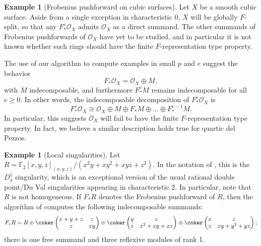 \documentclass[12pt]{amsart}
\def\OO{\mathcal O}
\def\FF{\mathbb F}
\theoremstyle{theorem}
\numberwithin{thm}{section}
\theoremstyle{definition}
\newtheorem{exa}[thm]{Example}
\newcommand{\mahrud}[1]{{\color{ForestGreen} \sf $\blacklozenge$ Mahrud: [#1]}}
\begin{document}
\begin{exa}[Frobenius pushforward on cubic surfaces]
  Let $X$ be a smooth cubic surface. Aside from a single exception in characteristic 0, $X$ will be globally $F$-split, so that any $F^e_*\OO_X $ admits $\OO_X$ as a direct summand.
  The other summands of Frobenius pushforwards of $\OO_X$ have yet to be studied, and in particular it is not known whether such rings should have the finite $F$-representation type property.

  The use of our algorithm to compute examples in small $p$ and $e$ suggest the behavior
  $$ F_* \OO_X = \OO_X\oplus M, $$
  with $M$ indecomposable, and furthermore $F_*^e M$ remains indecomposable for all $e\geq 0$. In other words, the indecomposable decomposition of $F^e_* \OO_X$ is
  $$ F_*^e \OO_X \cong \OO_X\oplus M\oplus F_* M\oplus\dots\oplus F_*^{e-1}M. $$
  In particular, this suggests $\OO_X$ will fail to have the finite $F$-representation type property.
  In fact, we believe a similar description holds true for quartic del Pezzos.
\end{exa}


\begin{exa}[Local singularities]\label{exa:local-singularities}
  Let $R = \FF_2[x,y,z]_{(x,y,z)}/(x^2y+xy^2+xyz+z^2)$. In the notation of \cite{Artin77}, this is the $D_4^1$ singularity, which is an exceptional version of the usual rational double point/Du Val singularities appearing in characteristic 2.  In particular, note that $R$ is not homogeneous. If $F_* R$ denotes the Frobenius pushforward of $R$, then the algorithm of  computes the following indecomposable summands:
  $$
  F_*R = R\oplus
  \coker
  \begin{pmatrix}
    x+y+z&z\\
    z&xy
  \end{pmatrix}\oplus\coker \begin{pmatrix}
    y&z\\
    z&x^{2}+xy+xz
  \end{pmatrix}\oplus \coker\begin{pmatrix}
  x&z\\
  z&xy+y^{2}+yz
  \end{pmatrix};
  $$
  there is one free summand and three reflexive modules of rank 1.
\end{exa}
\end{document}
